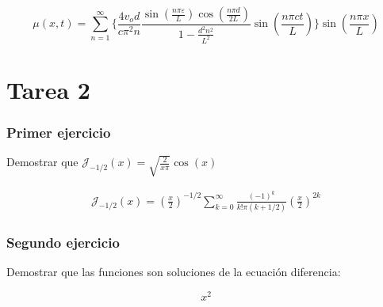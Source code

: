 \documentclass[11pt]{report}
\theoremstyle{plain}
\theoremstyle{definition}
\begin{document}
\begin{equation*}
	\mu(x,t)=\sum^\infty_{n=1}\lbrace \frac{4v_od}{c\pi^2n}\frac{\sin(\frac{n\pi\varepsilon}{L})\cos(\frac{n\pi d}{2L})}{1-\frac{d^2n^2}{L^2}} \sin(\frac{n\pi ct}{L})\rbrace\sin(\frac{n\pi x}{L})
\end{equation*}

\part{Tarea 2}
\section{Primer ejercicio}
Demostrar que $\mathcal{J}_{-1/2}(x) = \sqrt{\frac{2}{x\pi}}\cos(x)$

\begin{align*}
	\mathcal{J}_{-1/2}(x) = \left(\frac{x}{2}\right)^{-1/2} \sum^\infty_{k=0} \frac{(-1)^k}{k!\pi(k+1/2)} \left(\frac{x}{2}\right)^{2k}
\end{align*}

\section{Segundo ejercicio}
Demostrar que las funciones  son soluciones de la ecuación diferencia:

\begin{equation*}
	x^2
\end{equation*}
\end{document}
